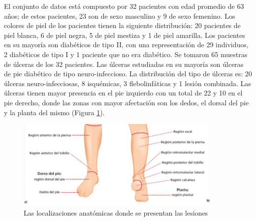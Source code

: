 El conjunto de datos está compuesto por 32 pacientes con edad promedio de 63 años; de estos pacientes, 23 son de sexo masculino y 9 de sexo femenino. Los colores de piel de los pacientes tienen la siguiente distribución: 20 pacientes de piel blanca, 6 de piel negra, 5 de piel mestiza y 1 de piel amarilla. Los pacientes en su mayoría son diabéticos de tipo II, con una representación de 29 individuos, 2 diabéticos de tipo I y 1 paciente que no era diabético. Se tomaron 65 muestras de úlceras de los 32 pacientes. Las úlceras estudiadas en su mayoría son úlceras de pie diabético de tipo neuro-infeccioso. La distribución del tipo de úlceras es: 20 úlceras neuro-infecciosas, 8 isquémicas, 3 flebolinfáticas y 1 lesión combinada. Las úlceras tienen mayor presencia en el pie izquierdo con un total de 22 y 10 en el pie derecho, donde las zonas con mayor afectación son los dedos, el dorsal del pie y la planta del mismo (Figura \ref{fig:loc}).

\begin{figure}[ht]
	\centering
	\includegraphics[width=10cm]{./Graphics/human.png}
	\caption{Las localizaciones anatómicas donde se presentan las lesiones}
	\label{fig:loc}
\end{figure}

